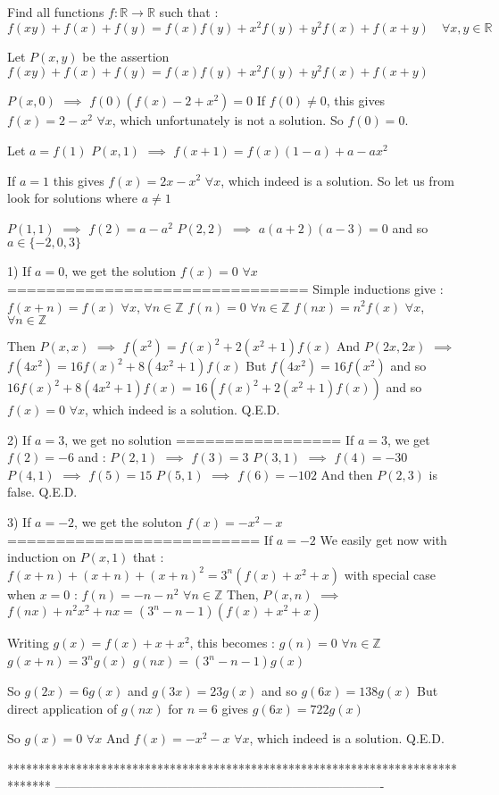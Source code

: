 \begin{solution}
	\begin{tcolorbox}Find all functions $f:\mathbb{R}\to \mathbb{R}$  such that : \[f(xy)+f(x)+f(y)=f(x)f(y)+x^2f(y)+y^2f(x)+f(x+y) \quad \forall x,y\in\mathbb R\]\end{tcolorbox}
Let $P(x,y)$ be the assertion $f(xy)+f(x)+f(y)=f(x)f(y)+x^2f(y)+y^2f(x)+f(x+y)$

$P(x,0)$ $\implies$ $f(0)(f(x)-2+x^2)=0$
If $f(0)\ne 0$, this gives $f(x)=2-x^2$ $\forall x$, which unfortunately is not a solution. So $f(0)=0$.

Let $a=f(1)$
$P(x,1)$ $\implies$ $f(x+1)=f(x)(1-a)+a-ax^2$

If $a=1$ this gives $\boxed{f(x)=2x-x^2}$ $\forall x$, which indeed is a solution.
So let us from look for solutions where $a\ne 1$

$P(1,1)$ $\implies$ $f(2)=a-a^2$
$P(2,2)$ $\implies$ $a(a+2)(a-3)=0$ and so $a\in\{-2, 0, 3\}$

1) If $a=0$, we get the solution $f(x)=0$ $\forall x$
===============================
Simple inductions give :
$f(x+n)=f(x)$ $\forall x$, $\forall n\in\mathbb Z$
$f(n)=0$ $\forall n\in\mathbb Z$
$f(nx)=n^2f(x)$ $\forall x$, $\forall n\in\mathbb Z$

Then $P(x,x)$ $\implies$ $f(x^2)=f(x)^2+2(x^2+1)f(x)$
And $P(2x,2x)$ $\implies$ $f(4x^2)=16f(x)^2+8(4x^2+1)f(x)$
But $f(4x^2)=16f(x^2)$ and so $16f(x)^2+8(4x^2+1)f(x)=16(f(x)^2+2(x^2+1)f(x))$ and so $\boxed{f(x)=0}$ $\forall x$, which indeed is a solution.
Q.E.D.


2) If $a=3$, we get no solution
=================
If $a=3$, we get $f(2)=-6$ and :
$P(2,1)$ $\implies$ $f(3)=3$
$P(3,1)$ $\implies$ $f(4)=-30$
$P(4,1)$ $\implies$ $f(5)=15$
$P(5,1)$ $\implies$ $f(6)=-102$
And then $P(2,3)$ is false. 
Q.E.D.

3) If $a=-2$, we get the soluton $f(x)=-x^2-x$
==========================
If $a=-2$
We easily get now with induction on $P(x,1)$ that :
$f(x+n)+(x+n)+(x+n)^2=3^n (f(x)+x^2+x)$ with special case when $x=0$ : $f(n)=-n-n^2$ $\forall n\in\mathbb Z$
Then, $P(x,n)$ $\implies$ $f(nx)+n^2x^2+nx=(3^n-n-1)(f(x)+x^2+x)$

Writing $g(x)=f(x)+x+x^2$, this becomes :
$g(n)=0$ $\forall n\in\mathbb Z$
$g(x+n)=3^ng(x)$
$g(nx)=(3^n-n-1)g(x)$

So $g(2x)=6g(x)$ and $g(3x)=23g(x)$ and so $g(6x)=138g(x)$
But direct application of $g(nx)$ for $n=6$ gives $g(6x)=722 g(x)$

So $g(x)=0$ $\forall x$
And $\boxed{f(x)=-x^2-x}$ $\forall x$, which indeed is a solution.
Q.E.D.
\end{solution}
*******************************************************************************
-------------------------------------------------------------------------------


